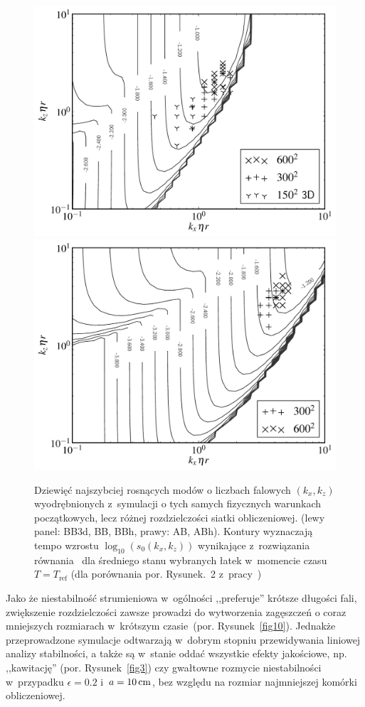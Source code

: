 \begin{figure}
  \includegraphics[width=0.48\linewidth]{figures/fig9a}
  \includegraphics[width=0.48\linewidth]{figures/fig9b}
  \caption{Dziewięć najszybciej rosnących modów o liczbach falowych $(k_x, k_z)$
     wyodrębnionych z~symulacji o tych samych fizycznych warunkach początkowych,
     lecz różnej rozdzielczości siatki obliczeniowej. (lewy panel: BB3d, BB,
     BBh, prawy: AB, ABh). Kontury wyznaczają tempo wzrostu $\log_{10}( s_0(k_x,
  k_z))$ wynikające z~rozwiązania równania~  dla średniego
  stanu wybranych łatek w~momencie czasu  $T = T_{\textrm{ref}}$ (dla porównania
  por. Rysunek.~2 z~pracy~\cite{YG05})}
   \label{fig9}
\end{figure}
%
\par Jako że niestabilność strumieniowa w~ogólności ,,preferuje'' krótsze
długości fali, zwiększenie rozdzielczości zawsze prowadzi do wytworzenia
 zagęszczeń o coraz mniejszych rozmiarach w~krótszym czasie~(por.
Rysunek~\ref{fig10}).  Jednakże przeprowadzone symulacje odtwarzają w~dobrym
stopniu przewidywania liniowej analizy stabilności, a także są w~stanie oddać
wszystkie efekty jakościowe, np. ,,kawitację'' (por. Rysunek~\ref{fig3}) czy
gwałtowne rozmycie niestabilności w~przypadku $\epsilon=0.2$ i~$a=10\hbox{$\thinspace\textrm{cm}$}$, bez
względu na rozmiar najmniejszej komórki obliczeniowej.

